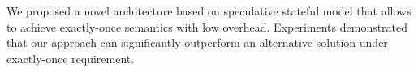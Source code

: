 \label {fs-short-conclusion}

We proposed a novel architecture based on speculative stateful model that allows to achieve exactly-once semantics with low overhead. Experiments demonstrated that our approach can significantly outperform an alternative solution under exactly-once requirement.